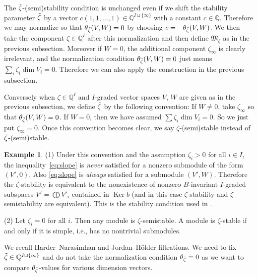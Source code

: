 \documentclass[pdftex]{sigma}
\theoremstyle{definition}
\newtheorem{Example}[equation]{Example}
\numberwithin{equation}{section}
\newcommand{\Q}{{\mathbb Q}}
\newcommand{\Ker}{\operatorname{Ker}}
\newcommand{\M}{{\mathfrak M}} %
\begin{document}
The $\Tilde\zeta$-(semi)stability condition is unchanged even if we
shift the stability parameter $\Tilde\zeta$ by a vector
$c(1,1,\dots,1)\in \Q^{I\sqcup\{\infty\}}$ with a constant $c\in \Q$.
Therefore we may normalize so that $\theta_{\Tilde\zeta}(V,W) = 0$
by choosing $c = -\theta_{\Tilde\zeta}(V,W)$.
We then take the component $\zeta\in\Q^I$ after this normalization and
then def\/ine $\M_\zeta$ as in the previous subsection.
Moreover if $W=0$, the additional component $\zeta_\infty$ is clearly
irrelevant, and the normalization condition
$\theta_{\Tilde\zeta}(V,W) = 0$ just means $\sum_i \zeta_i \dim V_i
= 0$. Therefore we can also apply the construction in the previous
subsection.

Conversely when $\zeta\in\Q^I$ and $I$-graded vector spaces $V$, $W$
are given as in the previous subsection, we def\/ine $\Tilde\zeta$ by
the following convention: If $W \neq 0$, take $\zeta_\infty$ so that
$\theta_{\Tilde\zeta}(V,W) = 0$. If $W = 0$, then we have assumed
$\sum \zeta_i \dim V_i = 0$. So we just put $\zeta_\infty = 0$.
%
Once this convention becomes clear, we say
$\zeta$-(semi)stable instead of $\Tilde\zeta$-(semi)stable.

\begin{Example}\label{ex:stndcham}
(1)
Under this convention and the assumption $\zeta_{i} > 0$ for all $i\in I$,
the inequali\-ty~\eqref{eq:slope} is {\it never\/} satisf\/ied for a
nonzero submodule of the form $(V',0)$. Also
\eqref{eq:slope} is {\it always} satisf\/ied for a submodule
$(V',W)$.
Therefore the $\zeta$-stability is equivalent to the nonexistence of
nonzero $B$-invariant $I$-graded subspaces $V' = \bigoplus V'_i$
contained in $\Ker b$
(and in this case $\zeta$-stability and $\zeta$-semistability
are equivalent). This is the stability condition used in
\cite[{3.9}]{Na-alg}.

(2) Let $\zeta_i = 0$ for all $i$. Then any module is
$\zeta$-semistable. A module is $\zeta$-stable if and only if it is
simple, i.e., has no nontrivial submodules.
\end{Example}

We recall Harder--Narasimhan and Jordan--H\"older f\/iltrations. We need
to f\/ix $\Tilde\zeta\in \Q^{I\sqcup\{\infty\}}$ and do not take the
normalization condition $\theta_{\Tilde\zeta} = 0$ as we want to
compare $\theta_{\Tilde\zeta}$-values for various dimension vectors.
\end{document}
